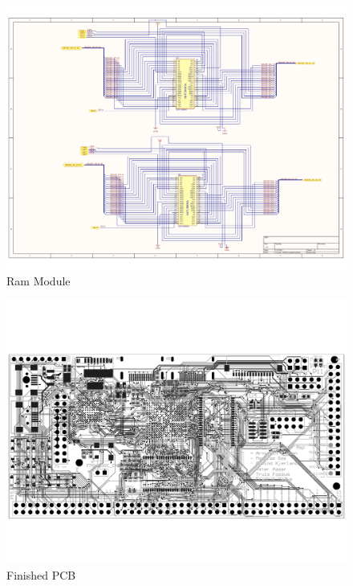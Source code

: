 \begin{figure}
    \includegraphics[width=\linewidth]{img/RAM_module.pdf}
    \caption{Ram Module}
    \label{fig:RAM_module}
\end{figure}

\begin{figure}
    \includegraphics[width=\linewidth]{img/PCB_Finished.pdf}
    \caption{Finished PCB}
    \label{fig:PCB_Finished}
\end{figure}
